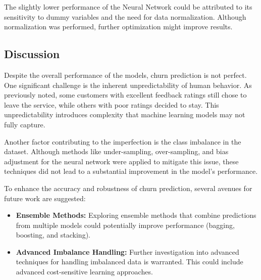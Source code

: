 \documentclass[12pt]{article}
\begin{document}
The slightly lower performance of the Neural Network could be attributed to its sensitivity to dummy variables and the need for data normalization. Although normalization was performed, further optimization might improve results.

\subsection{Discussion}

Despite the overall performance of the models, churn prediction is not perfect. One significant challenge is the inherent unpredictability of human behavior. As previously noted, some customers with excellent feedback ratings still chose to leave the service, while others with poor ratings decided to stay. This unpredictability introduces complexity that machine learning models may not fully capture.

Another factor contributing to the imperfection is the class imbalance in the dataset. Although methods like under-sampling, over-sampling, and bias adjustment for the neural network were applied to mitigate this issue, these techniques did not lead to a substantial improvement in the model's performance. 

To enhance the accuracy and robustness of churn prediction, several avenues for future work are suggested:
\begin{itemize}
    \item \textbf{Ensemble Methods:} Exploring ensemble methods that combine predictions from multiple models could potentially improve performance (bagging, boosting, and stacking).
    \item \textbf{Advanced Imbalance Handling:} Further investigation into advanced techniques for handling imbalanced data is warranted. This could include advanced cost-sensitive learning approaches.
\end{itemize}
\end{document}
